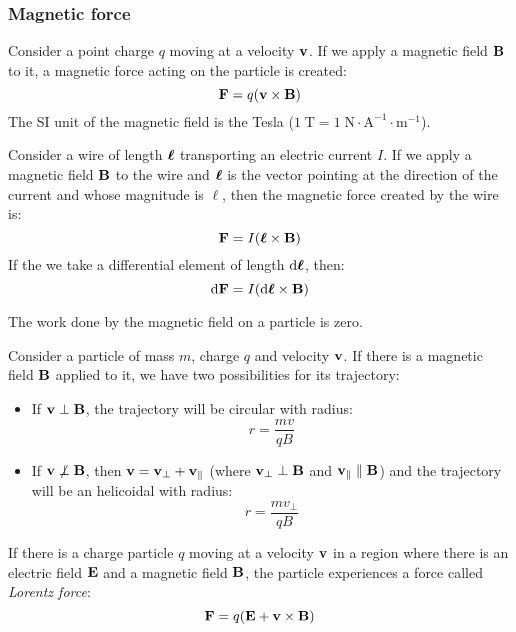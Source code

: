 \documentclass[../../../main.tex]{subfiles}
\begin{document}
\begin{multicols}{2}
    \subsubsection*{Magnetic force}
    \begin{prop}
        Consider a point charge $q$ moving at a velocity $\boldsymbol{\mathrm{v}}$. If we apply a magnetic field $\boldsymbol{\mathrm{B}}$ to it, a magnetic force acting on the particle is created: $$\boldsymbol{\mathrm{F}}=q(\boldsymbol{\mathrm{v}}\times\boldsymbol{\mathrm{B}})$$ The SI unit of the magnetic field is the Tesla ($1\;\text{T}=1\;\text{N}\cdot\text{A}^{-1}\cdot\text{m}^{-1}$).
    \end{prop}
    \begin{prop}
        Consider a wire of length $\vb*{\ell}$ transporting an electric current $I$. If we apply a magnetic field $\boldsymbol{\mathrm{B}}$ to the wire and $\vb*{\ell}$ is the vector pointing at the direction of the current and whose magnitude is $\ell$, then the magnetic force created by the wire is: $$\boldsymbol{\mathrm{F}}=I(\vb*{\ell}\times\boldsymbol{\mathrm{B}})$$ If the we take a differential element of length $\dd\vb*{\ell}$, then: $$\dd \boldsymbol{\mathrm{F}}=I(\dd\vb*{\ell}\times\boldsymbol{\mathrm{B}})$$
    \end{prop}
    \begin{lemma}
        The work done by the magnetic field on a particle is zero.
    \end{lemma}
    \begin{prop}
        Consider a particle of mass $m$, charge $q$ and velocity $\boldsymbol{\mathrm{v}}$. If there is a magnetic field $\boldsymbol{\mathrm{B}}$ applied to it, we have two possibilities for its trajectory:
        \begin{itemize}
            \item If $\boldsymbol{\mathrm{v}}\perp\boldsymbol{\mathrm{B}}$, the trajectory will be circular with radius: $$r=\frac{mv}{qB}$$
            \item If $\boldsymbol{\mathrm{v}}\not\perp\boldsymbol{\mathrm{B}}$, then $\boldsymbol{\mathrm{v}}=\boldsymbol{\mathrm{v}}_\perp+\boldsymbol{\mathrm{v}}_\parallel$ (where $\boldsymbol{\mathrm{v}}_\perp\perp\boldsymbol{\mathrm{B}}$ and $\boldsymbol{\mathrm{v}}_\parallel\parallel\boldsymbol{\mathrm{B}}$) and the trajectory will be an helicoidal with radius: $$r=\frac{mv_\perp}{qB}$$
        \end{itemize}
    \end{prop}
    \begin{prop}
        If there is a charge particle $q$ moving at a velocity $\boldsymbol{\mathrm{v}}$ in a region where there is an electric field $\boldsymbol{\mathrm{E}}$ and a magnetic field $\boldsymbol{\mathrm{B}}$, the particle experiences a force called \textit{Lorentz force}: $$\boldsymbol{\mathrm{F}}=q(\boldsymbol{\mathrm{E}}+\boldsymbol{\mathrm{v}}\times\boldsymbol{\mathrm{B}})$$
    \end{prop}

\end{multicols}
\end{document}
